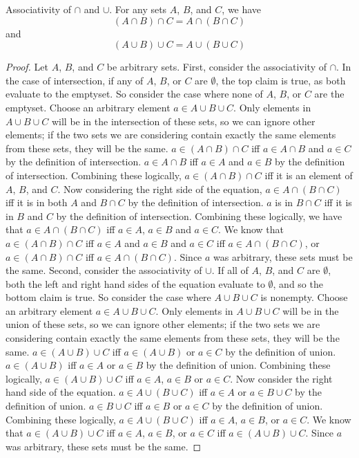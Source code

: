   \begin{majorEx}%
            Associativity of $\cap$ and $\cup$. For any sets $A$, $B$,
            and $C$, we have $$(A \cap B) \cap C = A \cap (B \cap C)$$
            and $$(A \cup B) \cup C = A \cup (B \cup C)$$
          \end{majorEx}
            \begin{proof}
            Let $A$, $B$, and $C$ be arbitrary sets. First, consider the associativity of $\cap$. In the case of intersection, if any of $A$, $B$, or $C$ are $\emptyset$, the top claim is true, as both evaluate to the emptyset. So consider the case where none of $A$, $B$, or $C$ are the emptyset. Choose an arbitrary element $a \in A \cup B \cup C$. Only elements in $A \cup B \cup C$ will be in the intersection of these sets, so we can ignore other elements; if the two sets we are considering contain exactly the same elements from these sets, they will be the same. $a \in (A \cap B) \cap C$ iff $a \in A \cap B$ and $a \in C$ by the definition of intersection. $a\in A \cap B$ iff $a \in A$ and $a \in B$ by the definition of intersection. Combining these logically, $a \in (A \cap B) \cap C$ iff it is an element of $A$, $B$, and $C$. Now considering the right side of the equation, $a \in A \cap (B \cap C)$ iff it is in both $A$ and $B \cap C$ by the definition of intersection. $a$ is in $B \cap C$ iff it is in $B$ and $C$ by the definition of intersection. Combining these logically, we have that $a \in A \cap (B \cap C)$ iff $a \in A$, $a \in B$ and $a \in C$. We know that $a \in (A \cap B) \cap C$ iff $a \in A$ and $a \in B$ and $a \in C$ iff $a \in A \cap (B \cap C)$, or $a \in (A \cap B) \cap C$ iff $a \in A \cap (B \cap C)$. Since $a$ was arbitrary, these sets must be the same. \newline
            Second, consider the associativity of $\cup$. If all of $A$, $B$, and $C$ are $\emptyset$, both the left and right hand sides of the equation evaluate to $\emptyset$, and so the bottom claim is true. So consider the case where $A \cup B \cup C$ is nonempty. Choose an arbitrary element $a \in A \cup B \cup C$. Only elements in $A \cup B \cup C$ will be in the union of these sets, so we can ignore other elements; if the two sets we are considering contain exactly the same elements from these sets, they will be the same. $a \in (A \cup B) \cup C$ iff $a \in (A \cup B)$ or $a \in C$ by the definition of union. $a \in (A \cup B)$ iff $a \in A$ or $a \in B$ by the definition of union. Combining these logically, $a \in (A \cup B) \cup C$ iff $a \in A$, $a \in B$ or $a \in C$. Now consider the right hand side of the equation. $a \in A \cup (B \cup C)$ iff $a \in A$ or $a \in B \cup C$ by the definition of union.  $a \in B \cup C$ iff $a \in B$ or $a \in C$ by the definition of union. Combining these logically, $a \in A \cup (B \cup C)$ iff $a \in A$, $a \in B$, or $a \in C$. We know that $a \in (A \cup B) \cup C$ iff $a \in A$, $a \in B$, or $a \in C$ iff $a \in (A \cup B) \cup C$. Since $a$ was arbitrary, these sets must be the same.
            \end{proof}


